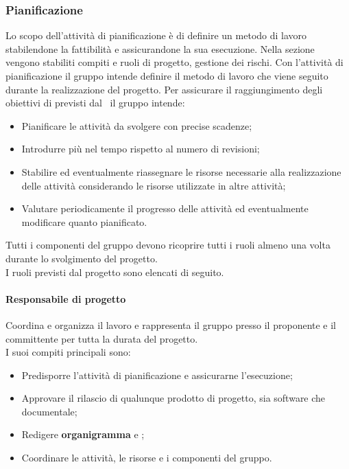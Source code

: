 \subsubsection{Pianificazione}
Lo scopo dell'attività di pianificazione è di definire un metodo di lavoro stabilendone la fattibilità e assicurandone la sua esecuzione.
Nella sezione vengono stabiliti compiti e ruoli di progetto, gestione dei rischi.
\label{AspettativePianificazione}Con l'attività di pianificazione il gruppo intende definire il metodo di lavoro che viene seguito durante la realizzazione del progetto. Per assicurare il raggiungimento degli obiettivi di  previsti dal \PdQ\ il gruppo intende:
\begin{itemize}
	\item Pianificare le attività da svolgere con precise scadenze;
	\item Introdurre più  nel tempo rispetto al numero di revisioni;
	\item Stabilire ed eventualmente riassegnare le risorse necessarie alla realizzazione delle attività considerando le risorse utilizzate in altre attività;
	\item Valutare periodicamente il progresso delle attività ed eventualmente modificare quanto pianificato.
\end{itemize}

Tutti i componenti del gruppo devono ricoprire tutti i ruoli almeno una volta durante lo svolgimento del progetto.\\
I ruoli previsti dal progetto sono elencati di seguito.
\paragraph*{Responsabile di progetto}
Coordina e organizza il lavoro e rappresenta il gruppo presso il proponente e il committente per tutta la durata del progetto.\\
I suoi compiti principali sono:
\begin{itemize}
	\item Predisporre l'attività di pianificazione e assicurarne l'esecuzione;
	\item Approvare il rilascio di qualunque prodotto di progetto, sia software che documentale;
	\item Redigere \textbf{organigramma} e {\PdP};
	\item Coordinare le attività, le risorse e i componenti del gruppo.
\end{itemize}


